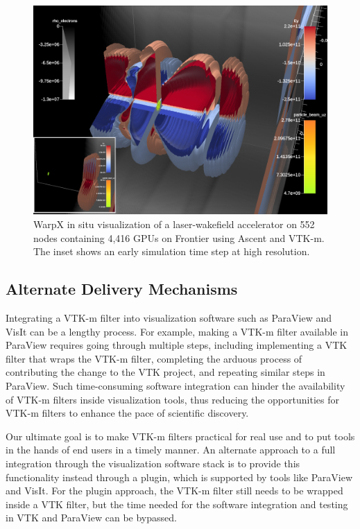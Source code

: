\begin{figure}[htb]
  \includegraphics[width=\linewidth]{figures/warpx_stages_lwfa.png}
  \caption{WarpX in situ visualization of a laser-wakefield accelerator on 552 nodes containing 4,416 GPUs on Frontier using Ascent and VTK-m.
  The inset shows an early simulation time step at high resolution.}
  \label{fig:warpx_lwfa}
\end{figure}

\subsection{Alternate Delivery Mechanisms}


Integrating a VTK-m filter into visualization software such as ParaView and VisIt can be a lengthy process. For example, making a VTK-m filter available in ParaView requires going through multiple steps, including implementing a VTK filter that wraps the VTK-m filter, completing the arduous process of contributing the change to the VTK project, and repeating similar steps in ParaView. Such time-consuming software integration can hinder the availability of VTK-m filters inside visualization tools, thus reducing the opportunities for VTK-m filters to enhance the pace of scientific discovery. 

Our ultimate goal is to make VTK-m filters practical for real use and to put tools in the hands of end users in a timely manner.
An alternate approach to a full integration through the visualization software stack is to provide this functionality instead through a plugin, which is supported by tools like ParaView and VisIt.
For the plugin approach, the VTK-m filter still needs to be wrapped inside a VTK filter, but the time needed for the software integration and testing in VTK and ParaView can be bypassed.       

